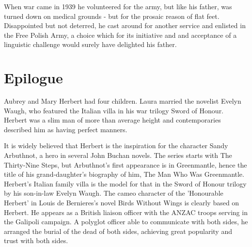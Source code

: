When war came in 1939 he volunteered for the army, but like his father, was turned down on medical grounds - but for the prosaic reason of flat feet. Disappointed but not deterred, he cast around for another service and enlisted in the Free Polish Army, a choice which for its initiative and and acceptance of a linguistic challenge would surely have delighted his father. 

\section*{Epilogue}
 
Aubrey and Mary Herbert had four children. Laura married the novelist Evelyn Waugh, who featured the Italian villa in his war trilogy Sword of Honour. Herbert was a slim man of more than average height and contemporaries described him as having perfect manners. 

It is widely believed that Herbert is the inspiration for the character Sandy Arbuthnot, a hero in several John Buchan novels. The series starts with The Thirty-Nine Steps, but Arbuthnot's first appearance is in Greenmantle, hence the title of his grand-daughter's biography of him, The Man Who Was Greenmantle. Herbert's Italian family villa is the model for that in the Sword of Honour trilogy by his son-in-law Evelyn Waugh.
The cameo character of the 'Honourable Herbert' in Louis de Bernieres's novel Birds Without Wings is clearly based on Herbert. He appears as a British liaison officer with the ANZAC troops serving in the Galipoli campaign. A polyglot officer able to communicate with both sides, he arranged the burial of the dead of both sides, achieving great popularity and trust with both sides.